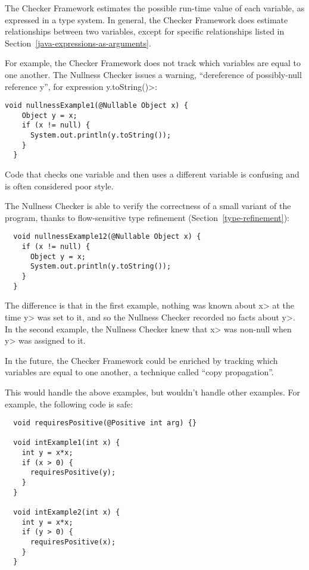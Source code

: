 


The Checker Framework estimates the possible run-time value of each
variable, as expressed in a type system.  In general, the Checker Framework
does estimate relationships between two variables, except for specific
relationships listed in Section~\ref{java-expressions-as-arguments}.

For example, the Checker Framework does not track which variables are equal
to one another.  The Nullness Checker issues a warning, ``dereference of
possibly-null reference y'', for expression \<y.toString()>:

\begin{Verbatim}
void nullnessExample1(@Nullable Object x) {
    Object y = x;
    if (x != null) {
      System.out.println(y.toString());
    }
  }
\end{Verbatim}

\noindent
Code that checks one variable and then uses a different variable is
confusing and is often considered poor style.

The Nullness Checker is able to verify the correctness of a small variant
of the program, thanks to flow-sensitive type refinement
(Section~\ref{type-refinement}):

\begin{Verbatim}
  void nullnessExample12(@Nullable Object x) {
    if (x != null) {
      Object y = x;
      System.out.println(y.toString());
    }
  }
\end{Verbatim}

The difference is that in the first example, nothing was known about \<x> at
the time \<y> was set to it, and so the Nullness Checker recorded no facts
about \<y>.  In the second example, the Nullness Checker knew that \<x>
was non-null when \<y> was assigned to it.

In the future, the Checker Framework could be enriched by tracking which
variables are equal to one another, a technique called ``copy
propagation''.

This would handle the above examples, but wouldn't handle other examples.
For example, the following code is safe:

\begin{Verbatim}
  void requiresPositive(@Positive int arg) {}

  void intExample1(int x) {
    int y = x*x;
    if (x > 0) {
      requiresPositive(y);
    }
  }

  void intExample2(int x) {
    int y = x*x;
    if (y > 0) {
      requiresPositive(x);
    }
  }
\end{Verbatim}


